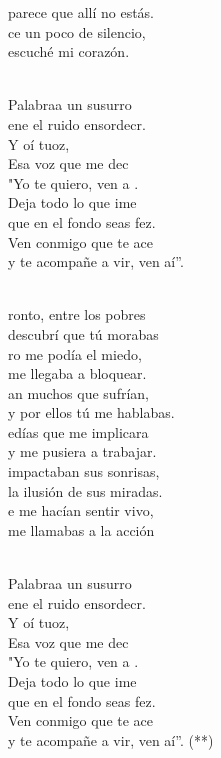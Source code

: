 \documentclass[12pt]{article}
\begin{document}
\begin{multicols*}{2}
\begin{cancion}
parece que allí no estás.\\
	ce un poco de silencio, \\
escuché mi corazón.\\\jump\\
	\begin{chorus}%
	 Palabraa un susurro \\
	ene el ruido ensordecr.\\
	Y oí tuoz,\\
	Esa voz que me dec \\
	"Yo te quiero, ven a . \\
	Deja todo lo que ime \\
	que en el fondo seas fez.\\
	Ven conmigo que te ace \\
	y te acompañe a vir, ven aí”.\\
	\end{chorus}%
	\jump\\
	ronto, entre los pobres \\
descubrí que tú morabas\\
	ro me podía el miedo, \\
me llegaba a bloquear.\\
	an muchos que sufrían, \\
y por ellos tú me hablabas.\\
	edías que me implicara \\
y me pusiera a trabajar.\\
	 impactaban sus sonrisas, \\
la ilusión de sus miradas.\\
	e me hacían sentir vivo, \\
me llamabas a la acción\\\jump\\
	\begin{chorus}%
	 Palabraa un susurro \\
	ene el ruido ensordecr.\\
	Y oí tuoz,\\
	Esa voz que me dec \\
	"Yo te quiero, ven a . \\
	Deja todo lo que ime \\
	que en el fondo seas fez.\\
	Ven conmigo que te ace \\
	y te acompañe a vir, ven aí”. (**)\\
	\end{chorus}%
	\jump\\
\end{cancion}%


\end{multicols*}
\end{document}
